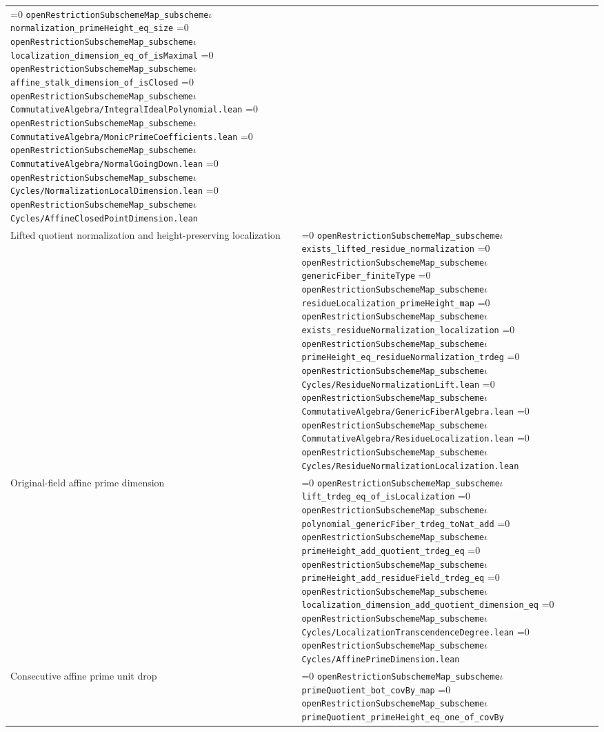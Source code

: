 \documentclass[11pt]{article}
\theoremstyle{definition}
\theoremstyle{remark}
\newcommand{\leanpath}[1]{%
  \ifnum\pdfstrcmp{\detokenize{#1}}%
      {\detokenize{openRestrictionSubschemeMap_subschemeι}}=0
    \texttt{\nolinkurl{openRestrictionSubschemeMap_subscheme}}\ensuremath{\iota}%
  \else
    \texttt{\nolinkurl{#1}}%
  \fi}
\begin{document}
\begin{longtable}{@{}>{\raggedright\arraybackslash}p{}
                >{\raggedright\arraybackslash}p{}@{}}
\leanpath{normalization_primeHeight_eq_size}\newline
\leanpath{localization_dimension_eq_of_isMaximal}\newline
\leanpath{affine_stalk_dimension_of_isClosed}\newline
\leanpath{CommutativeAlgebra/IntegralIdealPolynomial.lean}\newline
\leanpath{CommutativeAlgebra/MonicPrimeCoefficients.lean}\newline
\leanpath{CommutativeAlgebra/NormalGoingDown.lean}\newline
\leanpath{Cycles/NormalizationLocalDimension.lean}\newline
\leanpath{Cycles/AffineClosedPointDimension.lean}\\
Lifted quotient normalization and height-preserving localization &
\leanpath{exists_lifted_residue_normalization}\newline
\leanpath{genericFiber_finiteType}\newline
\leanpath{residueLocalization_primeHeight_map}\newline
\leanpath{exists_residueNormalization_localization}\newline
\leanpath{primeHeight_eq_residueNormalization_trdeg}\newline
\leanpath{Cycles/ResidueNormalizationLift.lean}\newline
\leanpath{CommutativeAlgebra/GenericFiberAlgebra.lean}\newline
\leanpath{CommutativeAlgebra/ResidueLocalization.lean}\newline
\leanpath{Cycles/ResidueNormalizationLocalization.lean}\\
Original-field affine prime dimension &
\leanpath{lift_trdeg_eq_of_isLocalization}\newline
\leanpath{polynomial_genericFiber_trdeg_toNat_add}\newline
\leanpath{primeHeight_add_quotient_trdeg_eq}\newline
\leanpath{primeHeight_add_residueField_trdeg_eq}\newline
\leanpath{localization_dimension_add_quotient_dimension_eq}\newline
\leanpath{Cycles/LocalizationTranscendenceDegree.lean}\newline
\leanpath{Cycles/AffinePrimeDimension.lean}\\
Consecutive affine prime unit drop &
\leanpath{primeQuotient_bot_covBy_map}\newline
\leanpath{primeQuotient_primeHeight_eq_one_of_covBy}\newline

\end{longtable}
\end{document}
